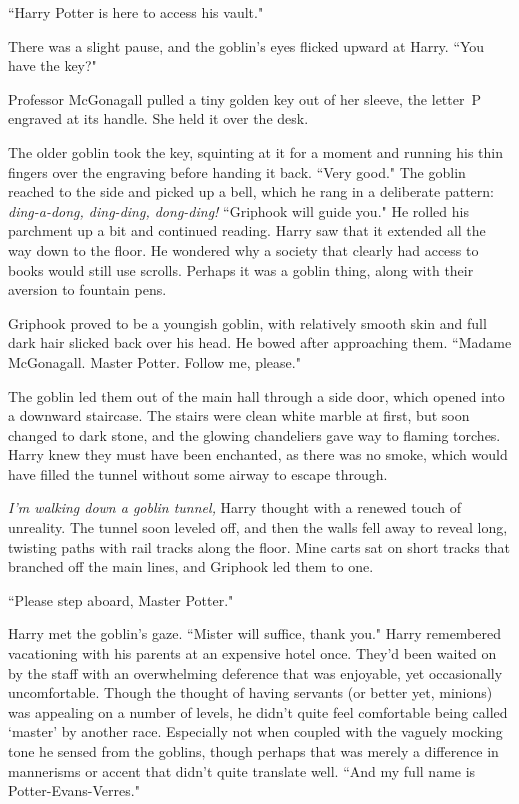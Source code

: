 ``Harry Potter is here to access his vault."

There was a slight pause, and the goblin's eyes flicked upward at Harry. ``You have the key?"

Professor McGonagall pulled a tiny golden key out of her sleeve, the letter~P engraved at its handle. She held it over the desk.

The older goblin took the key, squinting at it for a moment and running his thin fingers over the engraving before handing it back. ``Very good." The goblin reached to the side and picked up a bell, which he rang in a deliberate pattern: \emph{ding-a-dong, ding-ding, dong-ding!} ``Griphook will guide you." He rolled his parchment up a bit and continued reading. Harry saw that it extended all the way down to the floor. He wondered why a society that clearly had access to books would still use scrolls. Perhaps it was a goblin thing, along with their aversion to fountain pens.

Griphook proved to be a youngish goblin, with relatively smooth skin and full dark hair slicked back over his head. He bowed after approaching them. ``Madame McGonagall. Master Potter. Follow me, please."

The goblin led them out of the main hall through a side door, which opened into a downward staircase. The stairs were clean white marble at first, but soon changed to dark stone, and the glowing chandeliers gave way to flaming torches. Harry knew they must have been enchanted, as there was no smoke, which would have filled the tunnel without some airway to escape through.

\emph{I'm walking down a goblin tunnel,} Harry thought with a renewed touch of unreality. The tunnel soon leveled off, and then the walls fell away to reveal long, twisting paths with rail tracks along the floor. Mine carts sat on short tracks that branched off the main lines, and Griphook led them to one.

``Please step aboard, Master Potter."

Harry met the goblin's gaze. ``Mister will suffice, thank you." Harry remembered vacationing with his parents at an expensive hotel once. They'd been waited on by the staff with an overwhelming deference that was enjoyable, yet occasionally uncomfortable. Though the thought of having servants (or better yet, minions) was appealing on a number of levels, he didn't quite feel comfortable being called `master' by another race. Especially not when coupled with the vaguely mocking tone he sensed from the goblins, though perhaps that was merely a difference in mannerisms or accent that didn't quite translate well. ``And my full name is Potter-Evans-Verres."

